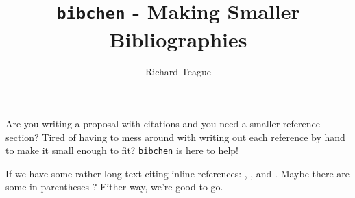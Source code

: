 \documentclass[a4paper, 12pt]{article}
\title{\texttt{bibchen} - Making Smaller Bibliographies}
\author{Richard Teague}
\begin{document}
\maketitle{}

Are you writing a proposal with citations and you need a smaller reference section? Tired of having to mess around with writing out each reference by hand to make it small enough to fit? \texttt{bibchen} is here to help!

If we have some rather long text citing inline references: \citet{Teague_ea_2018}, \citet{Teague_Foreman-Mackey_2018},  and \citet{Teague_ea_2017}. Maybe there are some in parentheses \citep{Teague_ea_2015, Teague_ea_2016}? Either way, we're good to go.


{}
\end{document}
